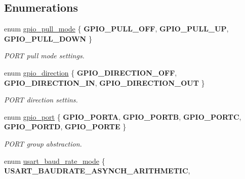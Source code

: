 \subsection*{Enumerations}
\begin{DoxyCompactItemize}
\item 
\mbox{\label{group___h_p_l_gab9959d4bcdc5049e5898d5100ada3197}} 
enum \hyperlink{group___h_p_l_gab9959d4bcdc5049e5898d5100ada3197}{gpio\+\_\+pull\+\_\+mode} \{ {\bfseries G\+P\+I\+O\+\_\+\+P\+U\+L\+L\+\_\+\+O\+FF}, 
{\bfseries G\+P\+I\+O\+\_\+\+P\+U\+L\+L\+\_\+\+UP}, 
{\bfseries G\+P\+I\+O\+\_\+\+P\+U\+L\+L\+\_\+\+D\+O\+WN}
 \}\begin{DoxyCompactList}\small\item\em P\+O\+RT pull mode settings. \end{DoxyCompactList}
\item 
\mbox{\label{group___h_p_l_gaccc7d029df9e5a96151a68e64f4be7e2}} 
enum \hyperlink{group___h_p_l_gaccc7d029df9e5a96151a68e64f4be7e2}{gpio\+\_\+direction} \{ {\bfseries G\+P\+I\+O\+\_\+\+D\+I\+R\+E\+C\+T\+I\+O\+N\+\_\+\+O\+FF}, 
{\bfseries G\+P\+I\+O\+\_\+\+D\+I\+R\+E\+C\+T\+I\+O\+N\+\_\+\+IN}, 
{\bfseries G\+P\+I\+O\+\_\+\+D\+I\+R\+E\+C\+T\+I\+O\+N\+\_\+\+O\+UT}
 \}\begin{DoxyCompactList}\small\item\em P\+O\+RT direction settins. \end{DoxyCompactList}
\item 
\mbox{\label{group___h_p_l_ga6d50d8c4b17ff573c07340d4d7965bc1}} 
enum \hyperlink{group___h_p_l_ga6d50d8c4b17ff573c07340d4d7965bc1}{gpio\+\_\+port} \{ \newline
{\bfseries G\+P\+I\+O\+\_\+\+P\+O\+R\+TA}, 
{\bfseries G\+P\+I\+O\+\_\+\+P\+O\+R\+TB}, 
{\bfseries G\+P\+I\+O\+\_\+\+P\+O\+R\+TC}, 
{\bfseries G\+P\+I\+O\+\_\+\+P\+O\+R\+TD}, 
\newline
{\bfseries G\+P\+I\+O\+\_\+\+P\+O\+R\+TE}
 \}\begin{DoxyCompactList}\small\item\em P\+O\+RT group abstraction. \end{DoxyCompactList}
\item 
\mbox{\label{group___h_p_l_ga59141b5eb86f4d53f17bbeab1d7c83e7}} 
enum \hyperlink{group___h_p_l_ga59141b5eb86f4d53f17bbeab1d7c83e7}{usart\+\_\+baud\+\_\+rate\+\_\+mode} \{ {\bfseries U\+S\+A\+R\+T\+\_\+\+B\+A\+U\+D\+R\+A\+T\+E\+\_\+\+A\+S\+Y\+N\+C\+H\+\_\+\+A\+R\+I\+T\+H\+M\+E\+T\+IC}, 

\end{DoxyCompactItemize}
